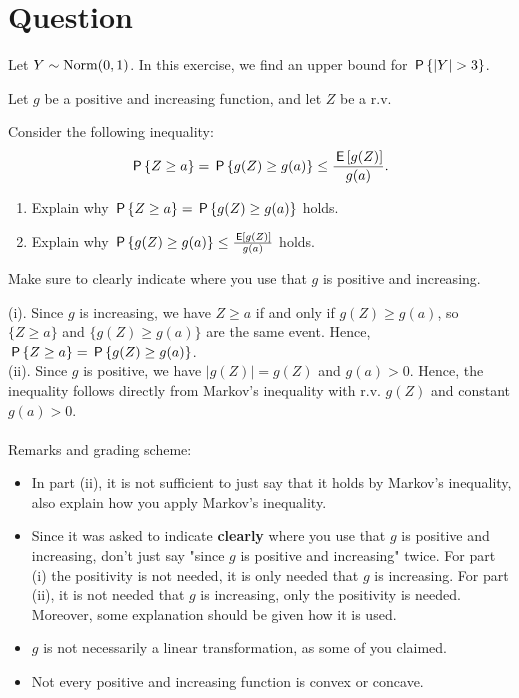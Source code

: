 \section{Question}

Let $Y \sim \Norm{0,1}$. 
In this exercise, we find an upper bound for $\P{|Y| > 3}$.

\begin{exercise}[1.5]
 Let $g$ be a positive and increasing function, and let $Z$ be a r.v. 

Consider the following inequality:
$$\P{Z \geq a} = \P{g(Z) \geq g(a)}   \leq \frac{\E{g(Z)}}{g(a)}.$$
\begin{enumerate}
\item[(i)] Explain why $\P{Z \geq a} = \P{g(Z) \geq g(a)}$ holds. 
\item[(ii)] Explain why $\P{g(Z) \geq g(a)}   \leq \frac{\E{g(Z)}}{g(a)}$ holds. 
\end{enumerate}
Make sure to clearly indicate where you use that  $g$ is positive and increasing. \\
\begin{solution}
(i). Since $g$ is increasing, we have $Z \geq a$ if and only if $g(Z) \geq g(a)$, so $\{Z \geq a\}$ and $\{g(Z) \geq g(a)\}$ are the same event. Hence,  $\P{Z \geq a} = \P{g(Z) \geq g(a)}$.  \\
(ii). Since $g$ is positive, we have $|g(Z)| = g(Z)$ and $g(a) > 0$. Hence, the inequality follows directly from Markov's inequality with r.v. $g(Z)$ and constant $g(a) > 0$. \\ \\
\noindent Remarks and grading scheme:
\begin{itemize}
\item In part (ii), it is not sufficient to just say that it holds by Markov's inequality, also explain how you apply Markov's inequality. 
\item Since it was asked to indicate \textbf{clearly} where you use that  $g$ is positive and increasing, don't just say "since $g$ is positive and increasing" twice. For part (i) the positivity is not needed, it is only needed that $g$ is increasing. For part (ii), it is not needed that $g$ is increasing, only the positivity is needed. Moreover, some explanation should be given how it is used. 
\item $g$ is not necessarily a linear transformation, as some of you claimed.
\item Not every positive and increasing function is convex or concave. \\ 

\end{itemize}
\end{solution}
\end{exercise}
